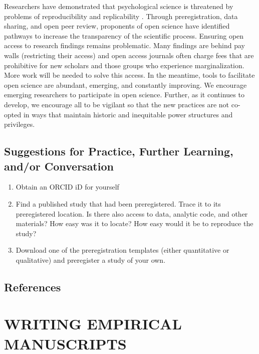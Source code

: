 \documentclass[
  11pt,
]{book}
\providecommand{\tightlist}{%
  \setlength{\itemsep}{0pt}\setlength{\parskip}{0pt}}
\begin{document}
Researchers have demonstrated that psychological science is threatened by problems of reproducibility and replicability \citep{open_science_collaboration_estimating_2015}. Through preregistration, data sharing, and open peer review, proponents of open science have identified pathways to increase the transparency of the scientific process. Ensuring open access to research findings remains problematic. Many findings are behind pay walls (restricting their access) and open access journals often charge fees that are prohibitive for new scholars and those groups who experience marginalization. More work will be needed to solve this access. In the meantime, tools to facilitate open science are abundant, emerging, and constantly improving. We encourage emerging researchers to participate in open science. Further, as it continues to develop, we encourage all to be vigilant so that the new practices are not co-opted in ways that maintain historic and inequitable power structures and privileges.

\hypertarget{suggestions-for-practice-further-learning-andor-conversation}{%
\section{Suggestions for Practice, Further Learning, and/or Conversation}\label{suggestions-for-practice-further-learning-andor-conversation}}

\begin{enumerate}
\def\labelenumi{\arabic{enumi}.}
\tightlist
\item
  Obtain an ORCID iD for yourself
\item
  Find a published study that had been preregistered. Trace it to its preregistered location. Is there also access to data, analytic code, and other materials? How easy was it to locate? How easy would it be to reproduce the study?
\item
  Download one of the preregistration templates (either quantitative or qualitative) and preregister a study of your own.
\end{enumerate}

\hypertarget{references-1}{%
\section{References}\label{references-1}}

\hypertarget{writing-empirical-manuscripts}{%
\chapter*{WRITING EMPIRICAL MANUSCRIPTS}\label{writing-empirical-manuscripts}}
\end{document}
